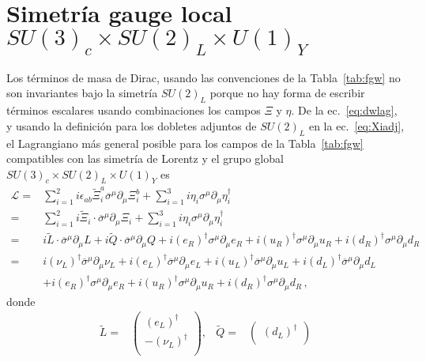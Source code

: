 \section{Simetría gauge local $SU(3)_c\times  SU(2)_L\times  U(1)_Y$}
\begin{frame}
Los términos de masa de Dirac, usando las convenciones de la
Tabla~\ref{tab:fgw} no son invariantes bajo la simetría $SU(2)_L$ porque
no hay forma de escribir términos escalares usando combinaciones los
campos $\Xi$ y $\eta$.  De la ec.~\eqref{eq:dwlag}, y usando la definición para los dobletes adjuntos de $SU(2)_L$ en la ec.~\eqref{eq:Xiadj}, el Lagrangiano más
general posible para los campos de la Tabla~\ref{tab:fgw} compatibles
con las simetría de Lorentz y el grupo global $SU(3)_c\times
SU(2)_L\times U(1)_Y$ es
\begin{align}
  \mathcal{L}=&\sum_{i=1}^2i\epsilon_{ab}\widetilde{\Xi}_i^{a}\overline{\sigma}^{\mu}\partial_{\mu}\Xi_i^{b}
+\sum_{i=1}^3i\eta_{i}\sigma^{\mu}\partial_{\mu} \eta^{\dagger}_i\nonumber\\
  =&\sum_{i=1}^2i\widetilde{\Xi}_i\cdot\overline{\sigma}^{\mu}\partial_{\mu}\Xi_i
+\sum_{i=1}^3i\eta_{i}\sigma^{\mu}\partial_{\mu} \eta^{\dagger}_i\nonumber\\
=&i\widetilde{L}\cdot\overline{\sigma}^{\mu}\partial_{\mu}L+i\widetilde{Q}\cdot\overline{\sigma}^{\mu}\partial_{\mu}Q
+i(e_R)^{\dagger}\sigma^{\mu}\partial_{\mu} e_R+i(u_R)^{\dagger}\sigma^{\mu}\partial_{\mu} u_R+i
(d_R)^{\dagger}\sigma^{\mu}\partial_{\mu} d_R \nonumber\\
=&i(\nu_L)^{\dagger}\overline{\sigma}^{\mu}\partial_{\mu}\nu_L+i(e_L)^{\dagger}\overline{\sigma}^{\mu}\partial_{\mu}e_L
+i (u_L)^{\dagger}\overline{\sigma}^{\mu}\partial_{\mu}u_L+i(d_L)^{\dagger}\overline{\sigma}^{\mu}\partial_{\mu}d_L \nonumber\\
&+i(e_R)^{\dagger}\sigma^{\mu}\partial_{\mu}e_R+i(u_R)^{\dagger}\sigma^{\mu}\partial_{\mu} u_R+i(d_R)^{\dagger}\sigma^{\mu}\partial_{\mu} d_R \,,
\end{align}
donde
\begin{align}
\label{eq:widetildeLQ}
  \widetilde{L}=&
  \begin{pmatrix}
   \left(e_L\right)^{\dagger}\\
  - \left(\nu_L  \right)^{\dagger}\\
  \end{pmatrix},&
  \widetilde{Q}=&
  \begin{pmatrix}
   \left(d_L\right)^{\dagger}\\

\end{pmatrix}
\end{align}
\end{frame}
